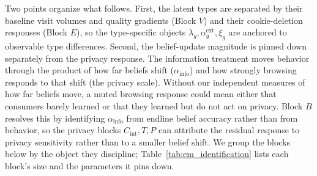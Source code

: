 \documentclass[12pt]{article}
\theoremstyle{definition}
\theoremstyle{remark}
\begin{document}
{Two points organize what follows. First, the latent types are separated by their baseline visit volumes and quality gradients (Block $V$) and their cookie-deletion responses (Block $E$), so the type-specific objects $\lambda_g, \alpha^{\text{ext}}_g, \xi_g$ are anchored to observable type differences. Second, the belief-update magnitude is pinned down separately from the privacy response. The information treatment moves behavior through the product of how far beliefs shift ($\alpha_{\text{info}}$) and how strongly browsing responds to that shift (the privacy scale). Without our independent measures of how far beliefs move, a muted browsing response could mean either that consumers barely learned or that they learned but do not act on privacy. Block $B$ resolves this by identifying $\alpha_{\text{info}}$ from endline belief accuracy rather than from behavior, so the privacy blocks $C_{\text{int}}, T, P$ can attribute the residual response to privacy sensitivity rather than to a smaller belief shift. We group the blocks below by the object they discipline; Table~\ref{tab:em_identification} lists each block's size and the parameters it pins down. 

}
\end{document}
